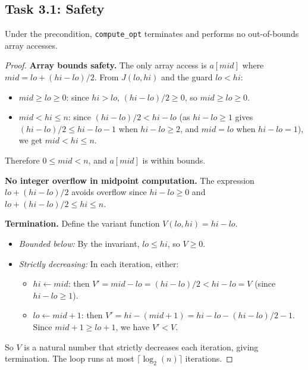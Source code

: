 \subsection{Task 3.1: Safety}

\begin{theorem}\label{thm:opt-safety}
Under the precondition, \texttt{compute\_opt} terminates and performs no
out-of-bounds array accesses.
\end{theorem}

\begin{proof}
\textbf{Array bounds safety.}
The only array access is $a[\mathit{mid}]$ where
$\mathit{mid} = \mathit{lo} + (\mathit{hi} - \mathit{lo}) / 2$.
From $J(\mathit{lo}, \mathit{hi})$ and the guard $\mathit{lo} < \mathit{hi}$:
\begin{itemize}
  \item $\mathit{mid} \geq \mathit{lo} \geq 0$: since $\mathit{hi} > \mathit{lo}$,
    $(\mathit{hi} - \mathit{lo})/2 \geq 0$, so $\mathit{mid} \geq \mathit{lo} \geq 0$.
  \item $\mathit{mid} < \mathit{hi} \leq n$: since $(\mathit{hi} - \mathit{lo})/2 < \mathit{hi} - \mathit{lo}$
    (as $\mathit{hi} - \mathit{lo} \geq 1$ gives $(\mathit{hi} - \mathit{lo})/2 \leq \mathit{hi} - \mathit{lo} - 1$
    when $\mathit{hi} - \mathit{lo} \geq 2$, and $\mathit{mid} = \mathit{lo}$ when
    $\mathit{hi} - \mathit{lo} = 1$), we get $\mathit{mid} < \mathit{hi} \leq n$.
\end{itemize}
Therefore $0 \leq \mathit{mid} < n$, and $a[\mathit{mid}]$ is within bounds.

\medskip\noindent
\textbf{No integer overflow in midpoint computation.}
The expression $\mathit{lo} + (\mathit{hi} - \mathit{lo}) / 2$ avoids overflow
since $\mathit{hi} - \mathit{lo} \geq 0$ and $\mathit{lo} + (\mathit{hi} - \mathit{lo})/2 \leq \mathit{hi} \leq n$.

\medskip\noindent
\textbf{Termination.}
Define the variant function $V(\mathit{lo}, \mathit{hi}) = \mathit{hi} - \mathit{lo}$.
\begin{itemize}
  \item \emph{Bounded below:} By the invariant, $\mathit{lo} \leq \mathit{hi}$,
    so $V \geq 0$.
  \item \emph{Strictly decreasing:} In each iteration, either:
    \begin{itemize}
      \item $\mathit{hi} \gets \mathit{mid}$: then $V' = \mathit{mid} - \mathit{lo}
        = (\mathit{hi} - \mathit{lo})/2 < \mathit{hi} - \mathit{lo} = V$
        (since $\mathit{hi} - \mathit{lo} \geq 1$).
      \item $\mathit{lo} \gets \mathit{mid} + 1$: then $V' = \mathit{hi} - (\mathit{mid} + 1)
        = \mathit{hi} - \mathit{lo} - (\mathit{hi} - \mathit{lo})/2 - 1$.
        Since $\mathit{mid} + 1 \geq \mathit{lo} + 1$, we have $V' < V$.
    \end{itemize}
\end{itemize}
So $V$ is a natural number that strictly decreases each iteration, giving termination.
The loop runs at most $\lceil\log_2(n)\rceil$ iterations.
\end{proof}

